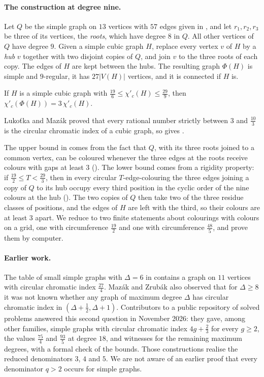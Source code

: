 \documentclass[11pt,colorlinks]{charlie}
\newcommand{\cind}{\chi'_c}
\begin{document}
\paragraph{The construction at degree nine.}
Let $Q$ be the simple graph on $13$ vertices with $57$ edges given in , and let $r_1,r_2,r_3$ be three of its vertices, the \emph{roots}, which have degree $8$ in $Q$. All other vertices of $Q$ have degree $9$. Given a simple cubic graph $H$, replace every vertex $v$ of $H$ by a \emph{hub} $v$ together with two disjoint copies of $Q$, and join $v$ to the three roots of each copy. The edges of $H$ are kept between the hubs. The resulting graph $\Phi(H)$ is simple and $9$-regular, it has $27|V(H)|$ vertices, and it is connected if $H$ is.

\begin{theorem}\label{thm:transfer-intro}
If $H$ is a simple cubic graph with $\frac{19}{6}\le\cind(H)\le\frac{29}{9}$, then $\cind(\Phi(H))=3\,\cind(H)$.
\end{theorem}

Lukoťka and Mazák \cite{LM} proved that every rational number strictly between $3$ and $\frac{10}{3}$ is the circular chromatic index of a cubic graph, so  gives .

The upper bound in  comes from the fact that $Q$, with its three roots joined to a common vertex, can be coloured whenever the three edges at the roots receive colours with gaps at least $3$ (). The lower bound comes from a rigidity property: if $\frac{19}{2}\le T<\frac{29}{3}$, then in every circular $T$-edge-colouring the three edges joining a copy of $Q$ to its hub occupy every third position in the cyclic order of the nine colours at the hub (). The two copies of $Q$ then take two of the three residue classes of positions, and the edges of $H$ are left with the third, so their colours are at least $3$ apart. We reduce  to two finite statements about colourings with colours on a grid, one with circumference $\frac{19}{2}$ and one with circumference $\frac{48}{5}$, and prove them by computer.

\paragraph{Earlier work.}
The table of small simple graphs with $\Delta=6$ in \cite{MZ} contains a graph on $11$ vertices with circular chromatic index $\frac{27}{4}$. Mazák and Zrubák also observed that for $\Delta\ge8$ it was not known whether any graph of maximum degree $\Delta$ has circular chromatic index in $(\Delta+\frac12,\Delta+1)$. Contributors to a public repository of solved problems \cite{SC} answered this second question in November 2026: they gave, among other families, simple graphs with circular chromatic index $4g+\frac23$ for every $g\ge2$, the values $\frac{75}{4}$ and $\frac{93}{5}$ at degree $18$, and witnesses for the remaining maximum degrees, with a formal check of the bounds. Those constructions realise the reduced denominators $3$, $4$ and $5$. We are not aware of an earlier proof that every denominator $q>2$ occurs for simple graphs.
\end{document}
